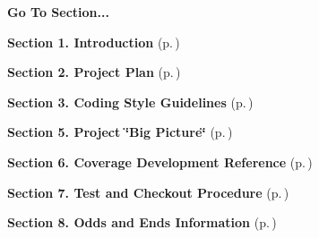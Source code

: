 \begin{Desc}
\item[{\bf Go To Section...}]\par
\begin{CompactItemize}
\item 
{\bf Section 1.  Introduction} {\rm (p.\,\pageref{page_intro})}\item 
{\bf Section 2.  Project Plan} {\rm (p.\,\pageref{page_project_plan})}\item 
{\bf Section 3.  Coding Style Guidelines} {\rm (p.\,\pageref{page_code_style})}\item 
{\bf Section 5.  Project \char`\"{}Big Picture\char`\"{}} {\rm (p.\,\pageref{page_big_picture})}\item 
{\bf Section 6.  Coverage Development Reference} {\rm (p.\,\pageref{page_code_details})}\item 
{\bf Section 7.  Test and Checkout Procedure} {\rm (p.\,\pageref{page_testing})}\item 
{\bf Section 8.  Odds and Ends Information} {\rm (p.\,\pageref{page_misc})}\end{CompactItemize}
\end{Desc}
